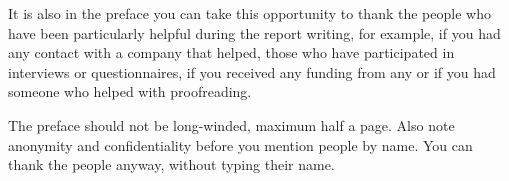 \documentclass[a4paper, 12pt, titlepage, abstract, numbers=enddot]{scrreprt}
\begin{document}
It is also in the preface you can take this opportunity to thank the people who have been particularly helpful during the report writing, for example, if you had any contact with a company that helped, those who have participated in interviews or questionnaires, if you received any funding from any or if you had someone who helped with proofreading.

The preface should not be long-winded, maximum half a page. Also note anonymity and confidentiality before you mention people by name. You can thank the people anyway, without typing their name.

\tableofcontents
\listoffigures
\newpage
{} %









\printbibliography

\clearpage
\setcounter{page}{1} %

\end{document}

